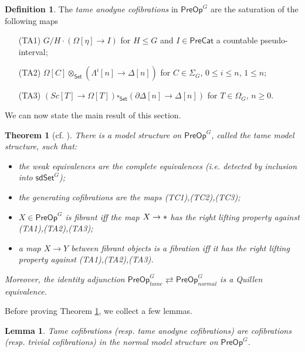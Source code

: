 \documentclass[a4paper,10pt
,draft
]{article}%
\numberwithin{equation}{section}
\numberwithin{figure}{section}
\newtheorem{theorem}[equation]{Theorem}%
\newtheorem{lemma}[equation]{Lemma}%
\theoremstyle{definition} %
\newtheorem{definition}[equation]{Definition}%
\newcommand{\1}{\ensuremath{\mathbbm 1}}%
\begin{document}
\begin{definition}\label{TAMEGENANO DEF}
	The \emph{tame anodyne cofibrations} in $\mathsf{PreOp}^G$ 
	are the saturation of the following maps
	\begin{itemize}
		\item[(TA1)] $G/H \cdot 
		\left(\Omega[\eta] \to I \right)$ for $H \leq G$
		and $I \in \mathsf{PreCat}$
		a countable pseudo-interval;
		\item[(TA2)] $\Omega[C] \otimes_{\mathsf{Set}}\left(\Lambda^i[n] \to \Delta[n]\right)$ for $C \in \Sigma_G$, $0 \leq i \leq n$, $1 \leq n$;
		\item[(TA3)] 
		$\left( Sc[T] \to \Omega[T] \right) 
		\square_{\mathsf{Set}} 
		\left(\partial \Delta[n] \to \Delta[n]\right)$ for $T \in \Omega_G$, $n \geq 0$.
	\end{itemize}
\end{definition}


We can now state the main result of this section.

\begin{theorem}[{cf. \cite[Thm. 7.19]{CM13b}}]\label{TAMEMS_THM}
	There is a model structure on 
	$\mathsf{PreOp}^G$,
	called the \emph{tame model structure},
	such that:
	\begin{itemize}
		\item the weak equivalences are the complete equivalences (i.e. detected by inclusion into 
		$\mathsf{sdSet}^G$);
		\item the generating cofibrations are the maps (TC1),(TC2),(TC3);
		\item $X \in \mathsf{PreOp}^G$ is fibrant iff
		the map $X \to \**$ has the right lifting property against 
		(TA1),(TA2),(TA3);
		\item a map $X \to Y$ between fibrant objects is a fibration iff
		it has the right lifting property against 
		(TA1),(TA2),(TA3).
	\end{itemize}
	Moreover, the identity adjunction
	$
	\mathsf{PreOp}^G_{tame} 
	\rightleftarrows
	\mathsf{PreOp}^G_{normal} 
	$
	is a Quillen equivalence.
\end{theorem}


Before proving Theorem \ref{TAMEMS_THM},
we collect a few lemmas.

\begin{lemma}\label{TAMECOFCOF_LEM}
	Tame cofibrations (resp. tame anodyne cofibrations) are  cofibrations (resp. trivial cofibrations) in the normal model structure on $\mathsf{PreOp}^G$.
\end{lemma}
\end{document}
